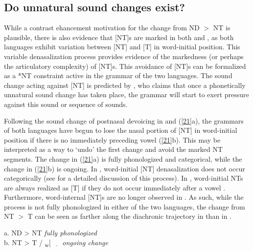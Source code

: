 \documentclass[output=paper,hidelinks]{langscibook}
\begin{document}
\subsection{Do unnatural sound changes exist?}\label{sec:lapierre:4.4}

While a contrast ehancement motivation for the change from ND $>$ NT is plausible, there is also evidence that [NT]s are marked in both  and , as both languages exhibit variation between [NT] and [T] in word-initial position. This variable denasalization process provides evidence of the markedness (or perhaps the articulatory complexity) of [NT]s. This avoidance of [NT]s can be formalized as a *NT constraint active in the grammar of the two languages. The sound change acting against [NT] is predicted by \citet{Begus2019}, who claims that once a phonetically unnatural sound change has taken place, the grammar will start to exert pressure against this sound or sequence of sounds.

Following the sound change of postnasal devoicing in  and  (\ref{21}a), the grammars of both languages have begun to lose the nasal portion of [NT] in word-initial position if there is no immediately preceding vowel (\ref{21}b). This may be interpreted as a way to `undo' the first change and avoid the marked NT segments. The change in (\ref{21}a) is fully phonologized and categorical, while the change in (\ref{21}b) is ongoing. In , word-initial [NT] denasalization does not occur categorically (see \citealt{Lapierre2019} for a detailed discussion of this process). In , word-initial NTs are always realized as [T] if they do not occur immediately after a vowel \citep{Alves2007}. Furthermore, word-internal [NT]s are no longer observed in . As such, while the process is not fully phonologized in either of the two languages, the change from NT $>$ T can be seen as farther along the diachronic trajectory in  than in . 

\ea\label{21} a. ND > NT	\hspace{1.5cm}	\textit{fully phonologized}\\ 
b. NT > T / \textsubscript{w}$[$ $\underline{\hspace{1em}}$ \hspace{.6cm} \textit{ongoing change} \z
\end{document}
